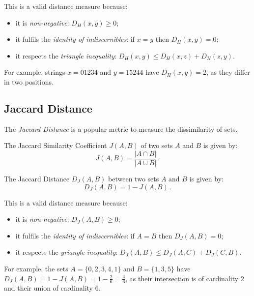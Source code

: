 This is a valid distance measure because:
\begin{itemize}
  \item it is \textit{non-negative}: $D_H(x,y) \geq 0$;
  \item it fulfils the \textit{identity of indiscernibles}: if $x = y$ then $D_H(x,y)=0$;
  \item it respects the \textit{triangle inequality}: $D_H(x,y) \leq D_H(x,z) + D_H(z,y) $.
\end{itemize}

For example, strings $x=01234$ and $y=15244$ have $D_H(x,y)=2$, as they differ in two positions.

\subsection{Jaccard Distance} \label{subsec:jaccard-distance}
The \textit{Jaccard Distance} is a popular metric to measure the dissimilarity of sets.
\begin{definition} \label{def:jaccard}
	The Jaccard Similarity Coefficient $J(A,B)$ of two sets $A$ and $B$ is given by:
	\begin{equation*}
		J(A,B) = \frac{|A \cap B |}{| A \cup B |} \,.
	\end{equation*}
\end{definition}
\begin{definition}
	The Jaccard Distance $D_J(A,B)$ between two sets $A$ and $B$ is given by:
	\begin{equation*}
		D_J(A,B) = 1 - J(A,B) \,.
	\end{equation*}
\end{definition}

This is a valid distance measure because:
\begin{itemize}
  \item it is \textit{non-negative}: $D_J(A,B) \geq 0$;
  \item it fulfils the \textit{identity of indiscernibles}: if $A = B$ then $D_J(A,B)=0$;
  \item it respects the \textit{yriangle inequality}: $D_J(A,B) \leq D_J(A,C) + D_J(C,B) $.
\end{itemize}

For example, the sets $A = \{ 0, 2, 3, 4, 1 \}$ and $B = \{ 1, 3, 5 \}$ have $D_J(A,B) = 1- J(A,B) = 1- \frac{2}{6} = \frac{4}{6} $, as their intersection is of cardinality 2 and their union of cardinality 6.
